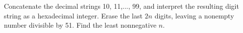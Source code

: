 Concatenate the decimal strings 10, 11,..., 99, and interpret the resulting digit string as a hexadecimal integer. Erase the last $2n$ digits, leaving a nonempty number divisible by 51. Find the least nonnegative $n$.
